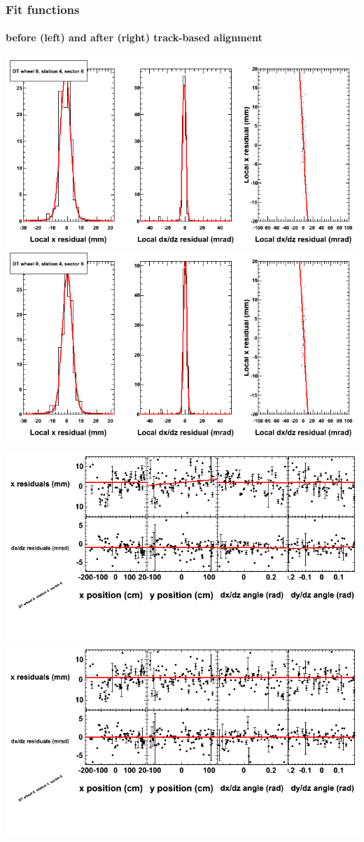 \documentclass[compress]{beamer}
\begin{document}
\begin{frame}
\frametitle{Fit functions}
\framesubtitle{before (left) and after (right) track-based alignment}
\includegraphics[width=0.5\linewidth]{fitfunctions_re01/MBwhCst4sec06_bellcurves.png} \includegraphics[width=0.5\linewidth]{fitfunctions_re05/MBwhCst4sec06_bellcurves.png}

\includegraphics[width=0.5\linewidth]{fitfunctions_re01/MBwhCst4sec06_polynomials.png} \includegraphics[width=0.5\linewidth]{fitfunctions_re05/MBwhCst4sec06_polynomials.png}
\end{frame}
\end{document}
